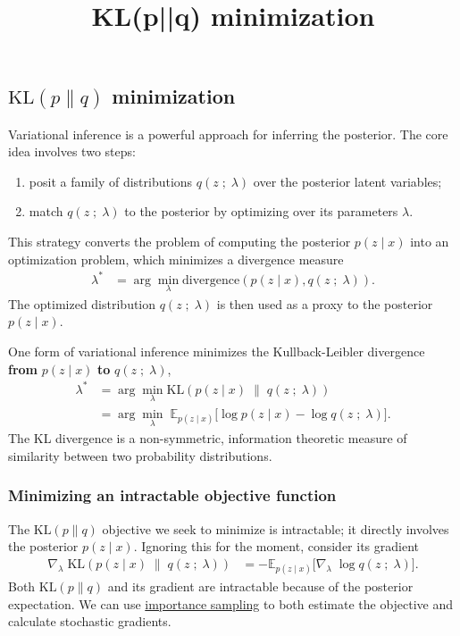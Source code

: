 \title{KL(p||q) minimization}

\subsection{$\text{KL}(p\|q)$ minimization}

Variational inference is a powerful approach for inferring the posterior. The
core idea involves two steps:
\begin{enumerate}
   \item posit a family of distributions $q(z\;;\;\lambda)$ over the
   posterior latent variables;
   \item match $q(z\;;\;\lambda)$ to the posterior by optimizing over its
   parameters $\lambda$.
 \end{enumerate}
This strategy converts the problem of computing the posterior $p(z \mid x)$ into
an optimization problem, which minimizes a divergence measure
\begin{align*}
  \lambda^*
  &=
  \arg\min_\lambda \text{divergence}(
  p(z \mid x)
  ,
  q(z\;;\;\lambda)
  ).
\end{align*}
The optimized distribution $q(z\;;\;\lambda)$ is then used as a
proxy to the posterior $p(z\mid x)$.

One form of variational inference minimizes the Kullback-Leibler divergence
\textbf{from} $p(z \mid x)$ \textbf{to} $q(z\;;\;\lambda)$,
\begin{align*}
  \lambda^*
  &=
  \arg\min_\lambda \text{KL}(
  p(z \mid x)
  \;\|\;
  q(z\;;\;\lambda)
  )\\
  &=
  \arg\min_\lambda\;
  \mathbb{E}_{p(z \mid x)}
  \big[
  \log p(z \mid x)
  -
  \log q(z\;;\;\lambda)
  \big].
\end{align*}
The KL divergence is a non-symmetric, information theoretic measure of
similarity between two probability distributions.

\subsubsection{Minimizing an intractable objective function}

The $\text{KL}(p\|q)$ objective we seek to minimize is intractable; it directly
involves the posterior $p(z \mid x)$. Ignoring this for the moment, consider its
gradient
\begin{align*}
  \nabla_\lambda\;
  \text{KL}(
  p(z \mid x)
  \;\|\;
  q(z\;;\;\lambda)
  )
  &=
  -
  \mathbb{E}_{p(z \mid x)}
  \big[
  \nabla_\lambda\;
  \log q(z\;;\;\lambda)
  \big].
\end{align*}
Both $\text{KL}(p\|q)$ and its gradient are intractable
because of the posterior expectation.
We can use \href{tut_KLpq_ais.html}{importance sampling} to both
estimate the objective and calculate stochastic gradients.
